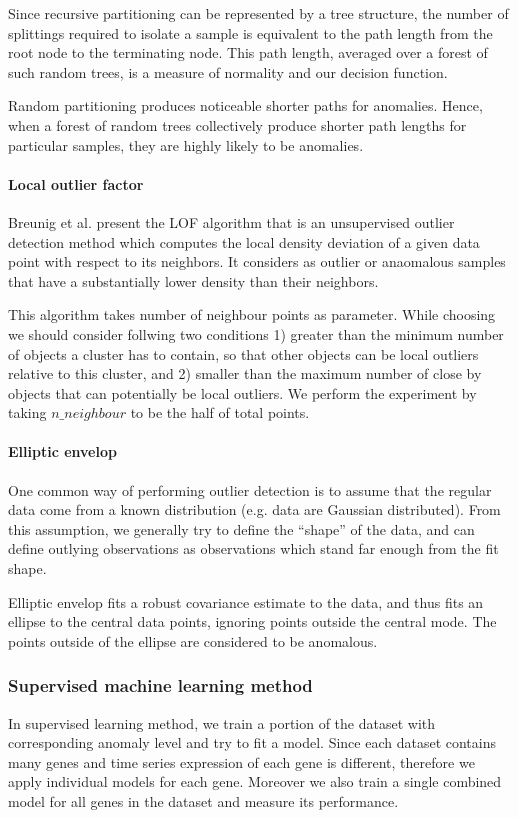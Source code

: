 Since recursive partitioning can be represented by a tree structure, the number of splittings required to isolate a sample is equivalent to the path length from the root node to the terminating node.
This path length, averaged over a forest of such random trees, is a measure of normality and our decision function.

Random partitioning produces noticeable shorter paths for anomalies. Hence, when a forest of random trees collectively produce shorter path lengths for particular samples, they are highly likely to be anomalies.


\paragraph*{\textbf{Local outlier factor}}
Breunig et al.\cite{local} present the LOF algorithm that is an unsupervised outlier detection method which computes the local density deviation of a given data point with respect to its neighbors. It considers as outlier or anaomalous samples that have a substantially lower density than their neighbors.

This algorithm takes number of neighbour points as parameter. While choosing we should consider follwing two conditions 1) greater than the minimum number of objects a cluster has to contain, so that other objects can be local outliers relative to this cluster, and 2) smaller than the maximum number of close by objects that can potentially be local outliers. We perform the experiment by taking $n\_neighbour$ to be the half of total points.


\paragraph*{\textbf{Elliptic envelop}}
One common way of performing outlier detection is to assume that the regular data come from a known distribution (e.g. data are Gaussian distributed). From this assumption, we generally try to define the “shape” of the data, and can define outlying observations as observations which stand far enough from the fit shape.

Elliptic envelop \cite{elliptic} fits a robust covariance estimate to the data, and thus fits an ellipse to the central data points, ignoring points outside the central mode. The points outside of the ellipse are considered to be anomalous.

\subsubsection{Supervised machine learning method}
In supervised learning method, we train a portion of the dataset with corresponding anomaly level and try to fit a model. Since each dataset contains many genes and time series expression of each gene is different, therefore we apply individual models for each gene. Moreover we also train a single combined model for all genes in the dataset and measure its performance.

